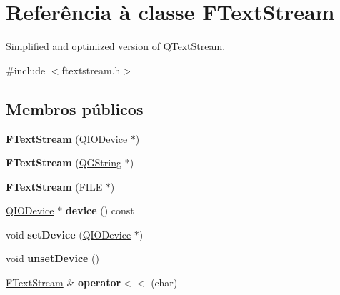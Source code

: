\hypertarget{class_f_text_stream}{\section{Referência à classe F\-Text\-Stream}
\label{class_f_text_stream}
}


Simplified and optimized version of \hyperlink{class_q_text_stream}{Q\-Text\-Stream}.  




{\ttfamily \#include $<$ftextstream.\-h$>$}

\subsection*{Membros públicos}
\begin{DoxyCompactItemize}
\item 
\hypertarget{class_f_text_stream_ae992445180e9b32ae14b077227c64b05}{{\bfseries F\-Text\-Stream} (\hyperlink{class_q_i_o_device}{Q\-I\-O\-Device} $\ast$)}\label{class_f_text_stream_ae992445180e9b32ae14b077227c64b05}

\item 
\hypertarget{class_f_text_stream_ac1c3659c27865726acf55dd7690f0aac}{{\bfseries F\-Text\-Stream} (\hyperlink{class_q_g_string}{Q\-G\-String} $\ast$)}\label{class_f_text_stream_ac1c3659c27865726acf55dd7690f0aac}

\item 
\hypertarget{class_f_text_stream_a9017edd1bb470132ebbd815116991268}{{\bfseries F\-Text\-Stream} (F\-I\-L\-E $\ast$)}\label{class_f_text_stream_a9017edd1bb470132ebbd815116991268}

\item 
\hypertarget{class_f_text_stream_a18846d79bf14c21d749e27eef80bb6a0}{\hyperlink{class_q_i_o_device}{Q\-I\-O\-Device} $\ast$ {\bfseries device} () const }\label{class_f_text_stream_a18846d79bf14c21d749e27eef80bb6a0}

\item 
\hypertarget{class_f_text_stream_a98230cf62c8603a7d0706e3044030f1b}{void {\bfseries set\-Device} (\hyperlink{class_q_i_o_device}{Q\-I\-O\-Device} $\ast$)}\label{class_f_text_stream_a98230cf62c8603a7d0706e3044030f1b}

\item 
\hypertarget{class_f_text_stream_aa6b00e03249023ce66f02861f5a6ffae}{void {\bfseries unset\-Device} ()}\label{class_f_text_stream_aa6b00e03249023ce66f02861f5a6ffae}

\item 
\hypertarget{class_f_text_stream_a6ec4a8c795fce9edfecabc2e4f2506db}{\hyperlink{class_f_text_stream}{F\-Text\-Stream} \& {\bfseries operator$<$$<$} (char)}\label{class_f_text_stream_a6ec4a8c795fce9edfecabc2e4f2506db}


\end{DoxyCompactItemize}
